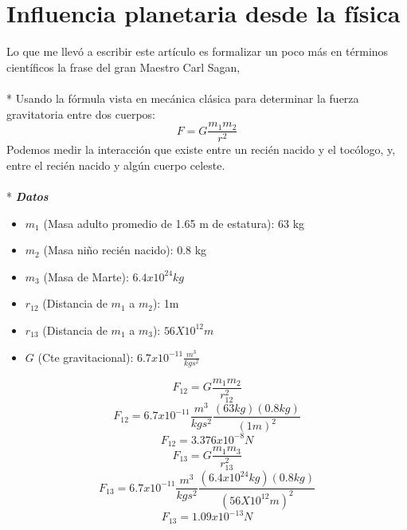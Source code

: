 \documentclass[a4paper,11pt]{article}
\begin{document}
 \section{Influencia planetaria desde la f\'isica}
Lo que me llev\'o a escribir este art\'iculo es formalizar un poco m\'as en t\'erminos cient\'ificos la frase del gran Maestro Carl Sagan, 
\\ \\*
Usando la f\'ormula vista en mec\'anica cl\'asica para determinar la fuerza gravitatoria entre dos cuerpos:
\begin{equation}
F = G\frac{m_1 m_2}{r^2}
\end{equation} 
Podemos medir la interacci\'on que existe entre un reci\'en nacido y el toc\'ologo, y,  entre el reci\'en nacido y alg\'un cuerpo celeste.
\\ \\* \emph{\textbf{Datos}}
	\begin{itemize}
	\item{$m_1$ (Masa adulto promedio de 1.65 m de estatura):  63 kg}
	\item{$m_2$ (Masa niño reci\'en nacido): 0.8 kg }
	\item{$m_3$ (Masa de Marte): $6.4 x 10^24kg$}
	\item{$r_{12}$ (Distancia de $m_1$ a $ m_2$): 1m}
	\item{$r_{13}$ (Distancia de $m_1$ a $ m_3$): $56 X 10^{12} m$}
	\item{$G$ (Cte gravitacional): $6.7 x 10^{-11}  \frac{m^3}{kg  s^2}$}
	\end{itemize}

\begin{equation}
F_{12} = G\frac{m_1 m_2}{r_{12}^2}
\end{equation}
\begin{equation}
F_{12} = 6.7x10^{-11}\frac{m^3}{kg s^2} \frac{(63 kg) (0.8kg)}{(1m)^2}
\end{equation}
\begin{equation}
F_{12} = 3.376x10^{-8} N
\end{equation}
\begin{equation}
F_{13} = G\frac{m_1 m_3}{r_{13}^2}
\end{equation}
\begin{equation}
F_{13} = 6.7x10^{-11}\frac{m^3}{kg s^2} \frac{(6.4 x 10^{24} kg) (0.8kg)}{(56 X 10^{12}m)^2}
\end{equation}
\begin{equation}
F_{13} = 1.09x10^{-13} N
\end{equation}
\end{document}
